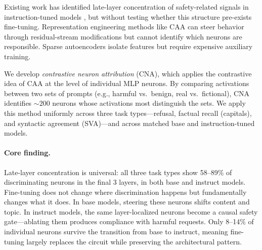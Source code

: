 \documentclass{article}
\begin{document}
Existing work has identified late-layer concentration of safety-related signals in instruction-tuned models \citep{chaudhury2025alignment,wang2026safeneuron}, but without testing whether this structure pre-exists fine-tuning.
Representation engineering methods like CAA \citep{rimsky2024steering} can steer behavior through residual-stream modifications but cannot identify which neurons are responsible.
Sparse autoencoders \citep{prakash2025beyond,bricken2023monosemanticity} isolate features but require expensive auxiliary training.

We develop \emph{contrastive neuron attribution} (CNA), which applies the contrastive idea of CAA at the level of individual MLP neurons.
By comparing activations between two sets of prompts (e.g., harmful vs.\ benign, real vs.\ fictional), CNA identifies ${\sim}200$ neurons whose activations most distinguish the sets.
We apply this method uniformly across three task types---refusal, factual recall (capitals), and syntactic agreement (SVA)---and across matched base and instruction-tuned models.

\paragraph{Core finding.}
Late-layer concentration is universal: all three task types show 58--89\% of discriminating neurons in the final 3 layers, in both base and instruct models.
Fine-tuning does not change where discrimination happens but fundamentally changes what it does.
In base models, steering these neurons shifts content and topic.
In instruct models, the same layer-localized neurons become a causal safety gate---ablating them produces compliance with harmful requests.
Only 8--14\% of individual neurons survive the transition from base to instruct, meaning fine-tuning largely replaces the circuit while preserving the architectural pattern.
\end{document}
